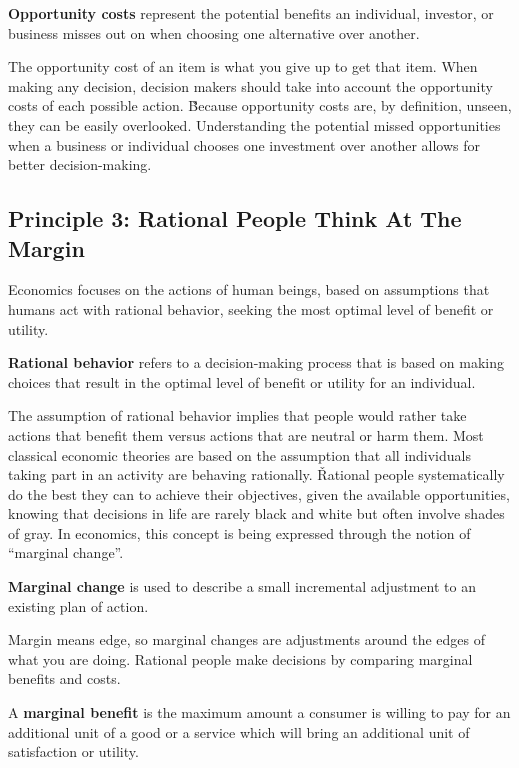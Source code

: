 \textbf{Opportunity costs} represent the potential benefits an individual, investor, or business misses out on when
choosing one alternative over another.
\ed

The opportunity cost of an item is what you give up to get that item. When making any decision, decision makers should
take into account the opportunity costs of each possible action. \v

Because opportunity costs are, by definition, unseen, they can be easily overlooked. Understanding the potential
missed opportunities when a business or individual chooses one investment over another allows for better decision-making.

\subsection*{Principle 3: Rational People Think At The Margin}

Economics focuses on the actions of human beings, based on assumptions that humans act with rational behavior, seeking
the most optimal level of benefit or utility.

\textbf{Rational behavior} refers to a decision-making process that is based on making choices that result in the
optimal level of benefit or utility for an individual.
\ed

The assumption of rational behavior implies that people would rather take actions that benefit them versus actions
that are neutral or harm them. Most classical economic theories are based on the assumption that all individuals
taking part in an activity are behaving rationally. \v

Rational people systematically do the best they can to achieve their objectives, given the available opportunities,
knowing that decisions in life are rarely black and white but often involve shades of gray. In economics, this
concept is being expressed through the notion of ``marginal change''.

\textbf{Marginal change} is used to describe a small incremental adjustment to an existing plan of action.
\ed

Margin means edge, so marginal changes are adjustments around the edges of what you are doing. Rational people make
decisions by comparing marginal benefits and costs.

A \textbf{marginal benefit} is the maximum amount a consumer is willing to pay for an additional unit of a good or a
service which will bring an additional unit of satisfaction or utility.
\ed

